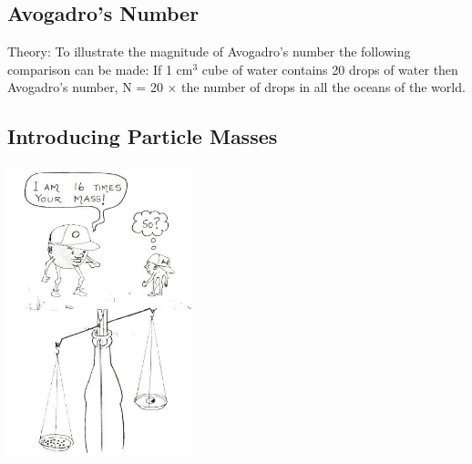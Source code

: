 \begin{multicols}{2}
\columnbreak

\subsection{Avogadro's Number}


\begin{description*}
\item[Theory:]{To illustrate the magnitude of Avogadro's
number the following comparison can be made:
If 1 cm$^3$ cube of water contains 20 drops of water
then Avogadro's number, N = 20 $\times$ the number of
drops in all the oceans of the world.}
\end{description*}

\subsection{Introducing Particle Masses}

\begin{center}
\includegraphics[width=0.4\textwidth]{./img/source/particle-mass.jpg}
\end{center}


\end{multicols}
